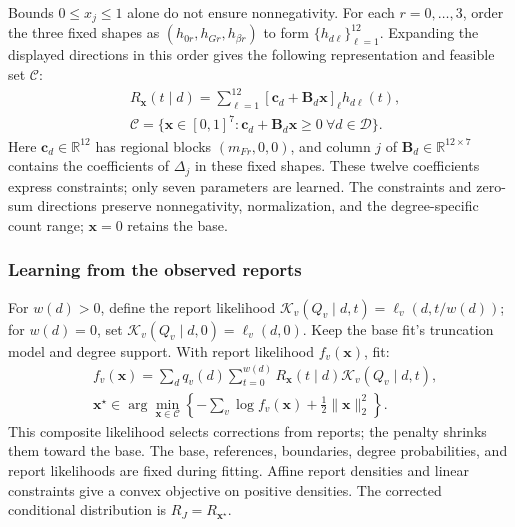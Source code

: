 Bounds $0\le x_j\le1$ alone do not ensure nonnegativity. For each $r=0,\ldots,3$, order the three fixed shapes as $(h_{0r},h_{Gr},h_{\beta r})$ to form $\{h_{d\ell}\}_{\ell=1}^{12}$. Expanding the displayed directions in this order gives the following representation and feasible set $\mathcal C$:
\begin{equation}
\begin{aligned}
&R_{\mathbf x}(t\mid d)=\sum_{\ell=1}^{12}
[\mathbf c_d+\mathbf B_d\mathbf x]_\ell h_{d\ell}(t),\\
&\mathcal C=\{\mathbf x\in[0,1]^7:
\mathbf c_d+\mathbf B_d\mathbf x\ge0\ \forall d\in\mathcal D\}.
\end{aligned}
\label{eq:joint_feasible_domain}
\end{equation}
Here $\mathbf c_d\in\mathbb R^{12}$ has regional blocks $(m_{Fr},0,0)$, and column $j$ of $\mathbf B_d\in\mathbb R^{12\times7}$ contains the coefficients of $\Delta_j$ in these fixed shapes. These twelve coefficients express constraints; only seven parameters are learned. The constraints and zero-sum directions preserve nonnegativity, normalization, and the degree-specific count range; $\mathbf x=0$ retains the base.

\subsubsection{Learning from the observed reports}
For $w(d)>0$, define the report likelihood $\mathcal K_v(Q_v\mid d,t)=\ell_v(d,t/w(d))$; for $w(d)=0$, set $\mathcal K_v(Q_v\mid d,0)=\ell_v(d,0)$. Keep the base fit's truncation model and degree support. With report likelihood $f_v(\mathbf x)$, fit:
\begin{equation}
\begin{aligned}
&f_v(\mathbf x)=\sum_dq_v(d)\sum_{t=0}^{w(d)}
R_{\mathbf x}(t\mid d)\mathcal K_v(Q_v\mid d,t),\\
&\mathbf x^\star\in\arg\min_{\mathbf x\in\mathcal C}
\left\{-\sum_v\log f_v(\mathbf x)+\frac12\|\mathbf x\|_2^2\right\}.
\end{aligned}
\label{eq:fusion_optimization}
\end{equation}
This composite likelihood selects corrections from reports; the penalty shrinks them toward the base. The base, references, boundaries, degree probabilities, and report likelihoods are fixed during fitting. Affine report densities and linear constraints give a convex objective on positive densities. The corrected conditional distribution is $R_J=R_{\mathbf x^\star}$.


